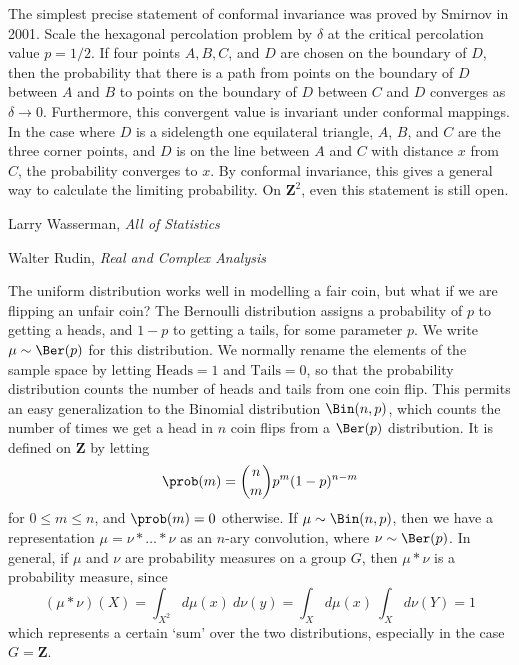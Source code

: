 The simplest precise statement of conformal invariance was proved by Smirnov in 2001. Scale the hexagonal percolation problem by $\delta$ at the critical percolation value $p = 1/2$. If four points $A,B,C$, and $D$ are chosen on the boundary of $D$, then the probability that there is a path from points on the boundary of $D$ between $A$ and $B$ to points on the boundary of $D$ between $C$ and $D$ converges as $\delta \to 0$. Furthermore, this convergent value is invariant under conformal mappings. In the case where $D$ is a sidelength one equilateral triangle, $A$, $B$, and $C$ are the three corner points, and $D$ is on the line between $A$ and $C$ with distance $x$ from $C$, the probability converges to $x$. By conformal invariance, this gives a general way to calculate the limiting probability. On $\mathbf{Z}^2$, even this statement is still open.





\begin{thebibliography}{10}
     Larry Wasserman,
    \emph{All of Statistics}

     Walter Rudin,
    \emph{Real and Complex Analysis}
\end{thebibliography}













\begin{example}
    The uniform distribution works well in modelling a fair coin, but what if we are flipping an unfair coin? The Bernoulli distribution assigns a probability of $p$ to getting a heads, and $1-p$ to getting a tails, for some parameter $p$. We write $\mu \sim \Ber(p)$ for this distribution. We normally rename the elements of the sample space by letting $\text{Heads} = 1$ and $\text{Tails} = 0$, so that the probability distribution counts the number of heads and tails from one coin flip. This permits an easy generalization to the Binomial distribution $\Bin(n,p)$, which counts the number of times we get a head in $n$ coin flips from a $\Ber(p)$ distribution. It is defined on $\mathbf{Z}$ by letting
    \[ \prob(m) = \binom{n}{m} p^m (1-p)^{n-m} \]
    for $0 \leq m \leq n$, and $\prob(m) = 0$ otherwise. If $\mu \sim \Bin(n,p)$, then we have a representation $\mu = \nu * \dots * \nu$ as an $n$-ary convolution, where $\nu \sim \Ber(p)$. In general, if $\mu$ and $\nu$ are probability measures on a group $G$, then $\mu * \nu$ is a probability measure, since
    \[ (\mu * \nu)(X) = \int_{X^2} d\mu(x)\ d\nu(y) = \int_X d\mu(x) \ \int_X d\nu(Y) = 1 \]
    which represents a certain `sum' over the two distributions, especially in the case $G = \mathbf{Z}$.
\end{example}

